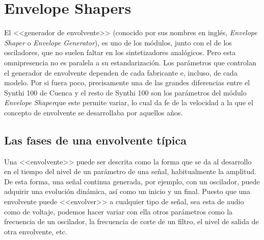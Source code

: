 \section{Envelope Shapers}

El <<generador de envolvente>> (conocido por sus nombres en inglés, \textit{Envelope Shaper} o \textit{Envelope Generator}), es uno de los módulos, junto con el de los osciladores, que no suelen faltar en los sintetizadores analógicos. Pero esta omnipresencia no es paralela a su estandarización. Los parámetros que controlan el generador de envolvente dependen de cada fabricante e, incluso, de cada modelo. Por si fuera poco, precisamente una de las grandes diferencias entre el Synthi 100 de Cuenca y el resto de Synthi 100 son los parámetros del módulo \textit{Envelope Shaper}que este permite variar, lo cual da fe de la velocidad a la que el concepto de envolvente se desarrollaba por aquellos años.

\subsection{Las fases de una envolvente típica}

Una <<envolvente>> puede ser descrita como la forma que se da al desarrollo en el tiempo del nivel de un parámetro de una señal, habitualmente la amplitud. De esta forma, una señal continua generada, por ejemplo, con un oscilador, puede adquirir una evolución dinámica, así como un inicio y un final. Puesto que una envolvente puede <<envolver>> a cualquier tipo de señal, sea esta de audio como de voltaje, podemos hacer variar con ella otros parámetros como la frecuencia de un oscilador, la frecuencia de corte de un filtro, el nivel de salida de otra envolvente, etc.

